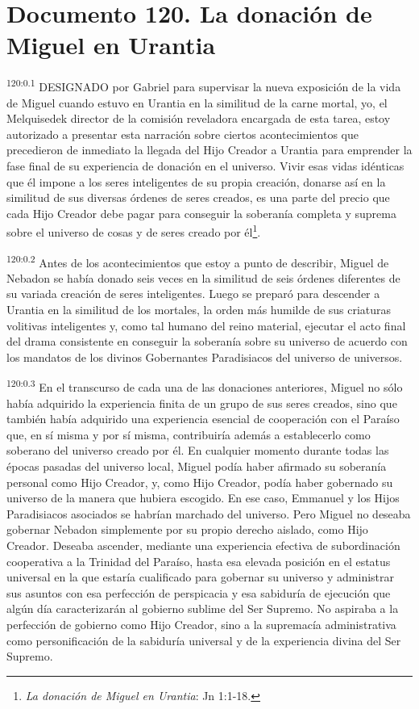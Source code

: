 \chapter{Documento 120. La donación de Miguel en Urantia}
\par
\textsuperscript{120:0.1} DESIGNADO por Gabriel para supervisar la nueva exposición de la vida de Miguel cuando estuvo en Urantia en la similitud de la carne mortal, yo, el Melquisedek director de la comisión reveladora encargada de esta tarea, estoy autorizado a presentar esta narración sobre ciertos acontecimientos que precedieron de inmediato la llegada del Hijo Creador a Urantia para emprender la fase final de su experiencia de donación en el universo. Vivir esas vidas idénticas que él impone a los seres inteligentes de su propia creación, donarse así en la similitud de sus diversas órdenes de seres creados, es una parte del precio que cada Hijo Creador debe pagar para conseguir la soberanía completa y suprema sobre el universo de cosas y de seres creado por él\footnote{\textit{La donación de Miguel en Urantia}: Jn 1:1-18.}.

\par
\textsuperscript{120:0.2} Antes de los acontecimientos que estoy a punto de describir, Miguel de Nebadon se había donado seis veces en la similitud de seis órdenes diferentes de su variada creación de seres inteligentes. Luego se preparó para descender a Urantia en la similitud de los mortales, la orden más humilde de sus criaturas volitivas inteligentes y, como tal humano del reino material, ejecutar el acto final del drama consistente en conseguir la soberanía sobre su universo de acuerdo con los mandatos de los divinos Gobernantes Paradisiacos del universo de universos.

\par
\textsuperscript{120:0.3} En el transcurso de cada una de las donaciones anteriores, Miguel no sólo había adquirido la experiencia finita de un grupo de sus seres creados, sino que también había adquirido una experiencia esencial de cooperación con el Paraíso que, en sí misma y por sí misma, contribuiría además a establecerlo como soberano del universo creado por él. En cualquier momento durante todas las épocas pasadas del universo local, Miguel podía haber afirmado su soberanía personal como Hijo Creador, y, como Hijo Creador, podía haber gobernado su universo de la manera que hubiera escogido. En ese caso, Emmanuel y los Hijos Paradisiacos asociados se habrían marchado del universo. Pero Miguel no deseaba gobernar Nebadon simplemente por su propio derecho aislado, como Hijo Creador. Deseaba ascender, mediante una experiencia efectiva de subordinación cooperativa a la Trinidad del Paraíso, hasta esa elevada posición en el estatus universal en la que estaría cualificado para gobernar su universo y administrar sus asuntos con esa perfección de perspicacia y esa sabiduría de ejecución que algún día caracterizarán al gobierno sublime del Ser Supremo. No aspiraba a la perfección de gobierno como Hijo Creador, sino a la supremacía administrativa como personificación de la sabiduría universal y de la experiencia divina del Ser Supremo.

